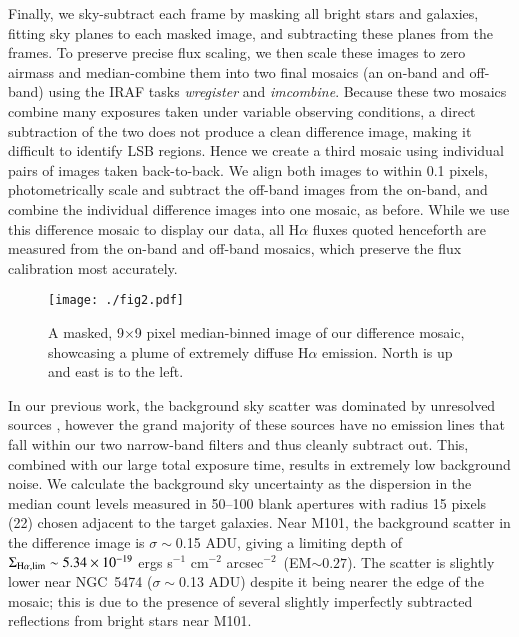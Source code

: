 \documentclass[iop]{emulateapj}
\newcommand{\sbunit}{ergs s$^{-1}$ cm$^{-2}$ arcsec$^{-2}$}
\begin{document}
Finally, we sky-subtract each frame by masking all bright stars and
galaxies, fitting sky planes to each masked image, and subtracting
these planes from the frames.  To preserve precise flux scaling, we
then scale these images to zero airmass and median-combine them into
two final mosaics (an on-band and off-band) using the IRAF tasks
\emph{wregister} and \emph{imcombine}.  Because these two mosaics
combine many exposures taken under variable observing conditions, a
direct subtraction of the two does not produce a clean difference
image, making it difficult to identify LSB regions.  Hence we create a
third mosaic using individual pairs of images taken back-to-back.  We
align both images to within 0.1 pixels, photometrically scale and subtract
the off-band images from the on-band, and combine the individual
difference images into one mosaic, as before.  While we use this
difference mosaic to display our data, all H$\alpha$ fluxes quoted
henceforth are measured from the on-band and off-band mosaics, which
preserve the flux calibration most accurately.

\begin{figure*}
  \centering
  \texttt{[image: ./fig2.pdf]}
  \caption[Tentative diffuse plume northeast of M101]{A masked, 9$\times$9
    pixel median-binned image of our difference mosaic, showcasing a
    plume of extremely diffuse H$\alpha$ emission.  North is up and
    east is to the left. \label{fig:diffuse}}
\end{figure*}

In our previous work, the background sky scatter was dominated by
unresolved sources \citep[background galaxies and foreground stars;
  see][]{rudick10}, however the grand majority of these sources have
no emission lines that fall within our two narrow-band filters and
thus cleanly subtract out.  This, combined with our large total
exposure time, results in extremely low background noise.  We
calculate the background sky uncertainty as the dispersion in the
median count levels measured in 50--100 blank apertures with radius 15
pixels (22\arcsec) chosen adjacent to the target galaxies.  Near M101,
the background scatter in the difference image is $\sigma\sim$0.15
ADU, giving a limiting depth of $\Sigma_{\rm H\alpha, \rm
  lim}\sim5.34\times 10^{-19}$ \sbunit\ (EM$\sim0.27$).  The scatter
is slightly lower near NGC~5474 ($\sigma\sim$0.13 ADU) despite it
being nearer the edge of the mosaic; this is due to the presence of
several slightly imperfectly subtracted reflections from bright stars
near M101.
\end{document}
